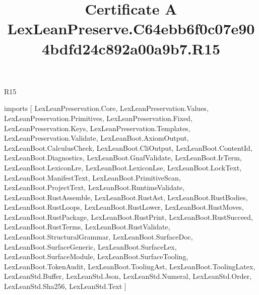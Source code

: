 \begin{lexlean}{R15}
\title{Certificate A LexLeanPreserve.C64ebb6f0c07e904bdfd24c892a00a9b7.R15}
\begin{coremodule}
imports [
  LexLeanPreservation.Core,
  LexLeanPreservation.Values,
  LexLeanPreservation.Primitives,
  LexLeanPreservation.Fixed,
  LexLeanPreservation.Keys,
  LexLeanPreservation.Templates,
  LexLeanPreservation.Validate,
  LexLeanBoot.AxiomOutput,
  LexLeanBoot.CalculusCheck,
  LexLeanBoot.CliOutput,
  LexLeanBoot.ContentId,
  LexLeanBoot.Diagnostics,
  LexLeanBoot.GnafValidate,
  LexLeanBoot.IrTerm,
  LexLeanBoot.LexiconLre,
  LexLeanBoot.LexiconLse,
  LexLeanBoot.LockText,
  LexLeanBoot.ManifestText,
  LexLeanBoot.PrimitiveScan,
  LexLeanBoot.ProjectText,
  LexLeanBoot.RuntimeValidate,
  LexLeanBoot.RustAssemble,
  LexLeanBoot.RustAst,
  LexLeanBoot.RustBodies,
  LexLeanBoot.RustLoops,
  LexLeanBoot.RustLower,
  LexLeanBoot.RustMoves,
  LexLeanBoot.RustPackage,
  LexLeanBoot.RustPrint,
  LexLeanBoot.RustSucceed,
  LexLeanBoot.RustTerms,
  LexLeanBoot.RustValidate,
  LexLeanBoot.StructuralGrammar,
  LexLeanBoot.SurfaceDoc,
  LexLeanBoot.SurfaceGeneric,
  LexLeanBoot.SurfaceLex,
  LexLeanBoot.SurfaceModule,
  LexLeanBoot.SurfaceTooling,
  LexLeanBoot.TokenAudit,
  LexLeanBoot.ToolingAst,
  LexLeanBoot.ToolingLatex,
  LexLeanStd.Buffer,
  LexLeanStd.Json,
  LexLeanStd.Numeral,
  LexLeanStd.Order,
  LexLeanStd.Sha256,
  LexLeanStd.Text
]


\end{coremodule}
\end{lexlean}
